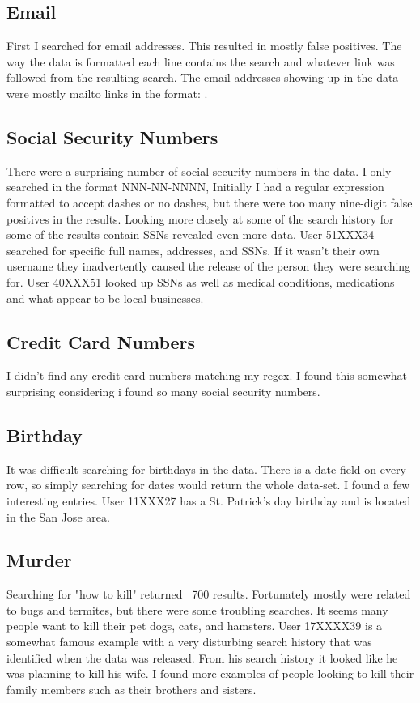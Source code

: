 \documentclass{article}
\begin{document}
\subsection{Email}
First I searched for email addresses. This resulted in mostly false positives. The way the data is formatted each line contains the search and whatever link was followed from the resulting search. The email addresses showing up in the data were mostly mailto links in the format: .
\subsection{Social Security Numbers}
There were a surprising number of social security numbers in the data. I only searched in the format NNN-NN-NNNN, Initially I had a regular expression formatted to accept dashes or no dashes, but there were too many nine-digit false positives in the results. Looking more closely at some of the search history for some of the results contain SSNs revealed even more data. User 51XXX34 searched for  specific full names, addresses, and SSNs. If it wasn’t their own username they inadvertently caused the release of the person they were searching for. User 40XXX51 looked up SSNs as well as medical conditions, medications and what appear to be local businesses.
\subsection{Credit Card Numbers}
I didn’t find any credit card numbers matching my regex. I found this somewhat surprising considering i found so many social security numbers.
\subsection{Birthday}
It was difficult searching for birthdays in the data. There is a date field on every row, so simply searching for dates would return the whole data-set. I found a few interesting entries. User 11XXX27 has a St. Patrick’s day birthday and is located in the San Jose area.
\subsection{Murder}
Searching for "how to kill" returned ~700 results. Fortunately mostly were related to bugs and termites, but there were some troubling searches. It seems many people want to kill their pet dogs, cats, and hamsters. User 17XXXX39 is a somewhat famous example\cite{murder} with a very disturbing search history that was identified when the data was released. From his search history it looked like he was planning to kill his wife. I found more examples of people looking to kill their family members such as their brothers and sisters.
\end{document}
